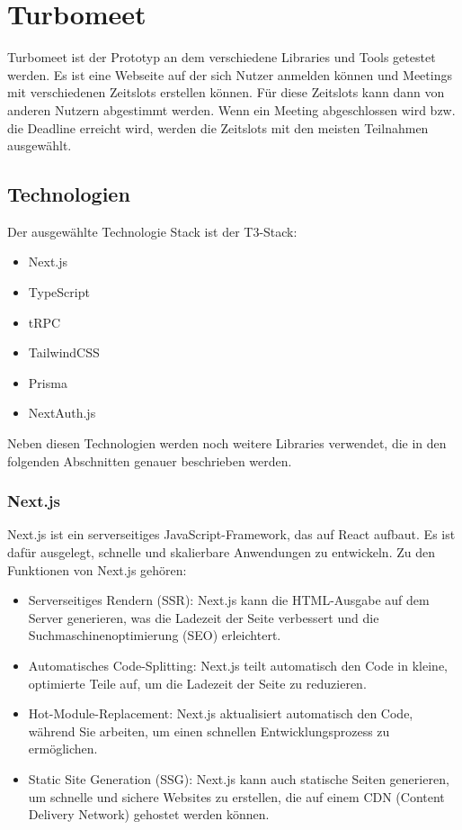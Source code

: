 \chapter{Turbomeet}
\label{Turbomeet}

Turbomeet ist der Prototyp an dem verschiedene Libraries und Tools getestet werden. Es ist eine Webseite auf der sich Nutzer anmelden können und Meetings mit verschiedenen Zeitslots erstellen können. Für diese Zeitslots kann dann von anderen Nutzern abgestimmt werden. Wenn ein Meeting abgeschlossen wird bzw. die Deadline erreicht wird, werden die Zeitslots mit den meisten Teilnahmen ausgewählt.

\section{Technologien}
\label{Technologies}

Der ausgewählte Technologie Stack ist der T3-Stack:

\begin{itemize}
    \item Next.js
    \item TypeScript
    \item tRPC
    \item TailwindCSS
    \item Prisma
    \item NextAuth.js
\end{itemize}

Neben diesen Technologien werden noch weitere Libraries verwendet, die in den folgenden Abschnitten genauer beschrieben werden.

\subsection{Next.js}

Next.js ist ein serverseitiges JavaScript-Framework, das auf React aufbaut. Es ist dafür ausgelegt, schnelle und skalierbare Anwendungen zu entwickeln. Zu den Funktionen von Next.js gehören:

\begin{itemize}
    \item Serverseitiges Rendern (SSR): Next.js kann die HTML-Ausgabe auf dem Server generieren, was die Ladezeit der Seite verbessert und die Suchmaschinenoptimierung (SEO) erleichtert.
    \item Automatisches Code-Splitting: Next.js teilt automatisch den Code in kleine, optimierte Teile auf, um die Ladezeit der Seite zu reduzieren.
    \item Hot-Module-Replacement: Next.js aktualisiert automatisch den Code, während Sie arbeiten, um einen schnellen Entwicklungsprozess zu ermöglichen.
    \item Static Site Generation (SSG): Next.js kann auch statische Seiten generieren, um schnelle und sichere Websites zu erstellen, die auf einem CDN (Content Delivery Network) gehostet werden können.
\end{itemize}

